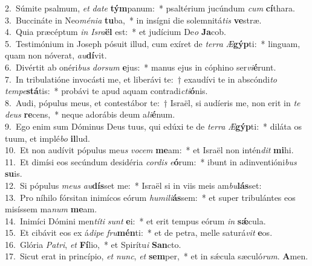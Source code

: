{2.~}Súmite psalmum, \textit{et} \textit{da}\textit{te} \textbf{tým}panum:~* psaltérium jucúndum \textit{cum} \textbf{cí}thara.\\
{3.~}Buccináte in Neo\textit{mé}\textit{ni}\textit{a} \textbf{tu}ba,~* in insígni die solemnitá\textit{tis} \textbf{ve}stræ.\\
{4.~}Quia præcéptum \textit{in} \textit{Is}\textit{ra}\textbf{ël} est:~* et judícium De\textit{o} \textbf{Ja}cob.\\
{5.~}Testimónium in Joseph pósuit illud, cum exíret de \textit{ter}\textit{ra} \textit{Æ}\textbf{gýp}ti:~* linguam, quam non nóverat, \textit{au}\textbf{dí}vit.\\
{6.~}Divértit ab onéri\textit{bus} \textit{dor}\textit{sum} \textbf{e}jus:~* manus ejus in cóphino ser\textit{vi}\textbf{é}runt.\\
{7.~}In tribulatióne invocásti me, et liberávi te:~† exaudívi te in abscóndi\textit{to} \textit{tem}\textit{pe}\textbf{stá}tis:~* probávi te apud aquam contradi\textit{cti}\textbf{ó}nis.\\
{8.~}Audi, pópulus meus, et contestábor te:~† Israël, si audíeris me, non erit in \textit{te} \textit{de}\textit{us} \textbf{re}cens,~* neque adorábis deum a\textit{li}\textbf{é}num.\\
{9.~}Ego enim sum Dóminus Deus tuus, qui edúxi te de \textit{ter}\textit{ra} \textit{Æ}\textbf{gýp}ti:~* diláta os tuum, et implé\textit{bo} \textbf{il}lud.\\
{10.~}Et non audívit pópulus me\textit{us} \textit{vo}\textit{cem} \textbf{me}am:~* et Israël non intén\textit{dit} \textbf{mi}hi.\\
{11.~}Et dimísi eos secúndum desidéria \textit{cor}\textit{dis} \textit{e}\textbf{ó}rum:~* ibunt in adinventióni\textit{bus} \textbf{su}is.\\
{12.~}Si pópulus \textit{me}\textit{us} \textit{au}\textbf{dís}set me:~* Israël si in viis meis am\textit{bu}\textbf{lás}set:\\
{13.~}Pro níhilo fórsitan inimícos eórum \textit{hu}\textit{mi}\textit{li}\textbf{ás}sem:~* et super tribulántes eos misíssem ma\textit{num} \textbf{me}am.\\
{14.~}Inimíci Dómini men\textit{tí}\textit{ti} \textit{sunt} \textbf{e}i:~* et erit tempus eórum \textit{in} \textbf{sǽ}cula.\\
{15.~}Et cibávit eos ex á\textit{di}\textit{pe} \textit{fru}\textbf{mén}ti:~* et de petra, melle saturá\textit{vit} \textbf{e}os.\\
{16.~}Glória \textit{Pa}\textit{tri}, \textit{et} \textbf{Fí}lio,~* et Spirítu\textit{i} \textbf{San}cto.\\
{17.~}Sicut erat in princípio, \textit{et} \textit{nunc}, \textit{et} \textbf{sem}per,~* et in sǽcula sæculó\textit{rum}. \textbf{A}men.\\
